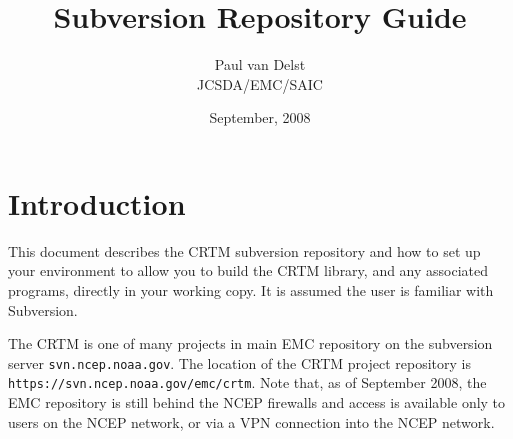 

\newcommand{\f}[1]{\texttt{#1}}

\title{Subversion Repository Guide}
\author{Paul van Delst\\JCSDA/EMC/SAIC}
\date{September, 2008}



\maketitle


\draftwatermark

\setcounter{page}{1}
  \tableofcontents\newpage
  \listoffigures\newpage
  \listoftables\newpage
{}
\setcounter{page}{1}


\chapter{Introduction}
This document describes the CRTM subversion repository and how to set up your environment to allow you to build the CRTM library, and any associated programs, directly in your working copy. It is assumed the user is familiar with Subversion.

The CRTM is one of many projects in main EMC repository on the subversion server \texttt{svn.ncep.noaa.gov}. The location of the CRTM project repository is \f{https://svn.ncep.noaa.gov/emc/crtm}. Note that, as of September 2008, the EMC repository is still behind the NCEP firewalls and access is available only to users on the NCEP network, or via a VPN connection into the NCEP network.


